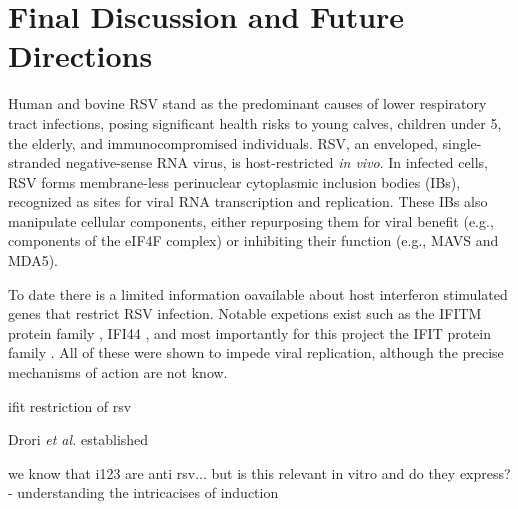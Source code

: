 \chapter{Final Discussion and Future Directions}
Human and bovine RSV stand as the predominant causes of lower respiratory tract infections, posing significant health risks to young calves, children under 5, the elderly, and immunocompromised individuals. RSV, an enveloped, single-stranded negative-sense RNA virus, is host-restricted \textit{in vivo}. In infected cells, RSV forms membrane-less perinuclear cytoplasmic inclusion bodies (IBs), recognized as sites for viral RNA transcription and replication. These IBs also manipulate cellular components, either repurposing them for viral benefit (e.g., components of the eIF4F complex) or inhibiting their function (e.g., MAVS and MDA5).

To date there is a limited information oavailable about host interferon stimulated genes that restrict RSV infection. Notable expetions exist such as the IFITM protein family \cite{Smith2019Interferon-InducedMembrane}, IFI44 \cite{McDonald2016ADisease, Li2021IdentificationVirus}, and most importantly for this project the IFIT protein family \cite{Drori2020InfluenzaProteins}. All of these were shown to impede viral replication, although the precise mechanisms of action are not know.



ifit restriction of rsv

Drori \textit{et al.} established

we know that i123 are anti rsv...
but is this relevant in vitro and do they express?
- understanding the intricacises of induction

